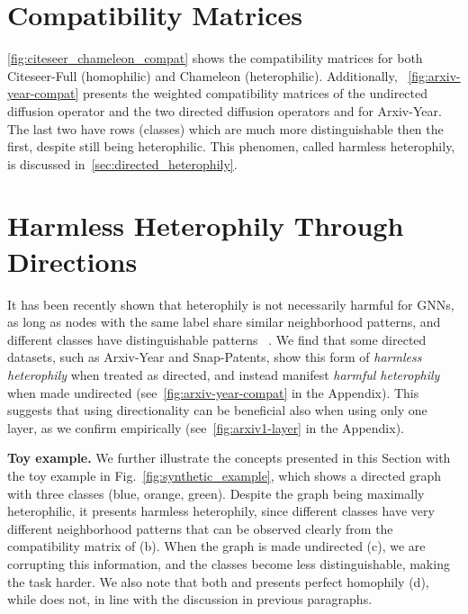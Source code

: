 \documentclass{article}
\theoremstyle{plain}
\theoremstyle{definition}
\theoremstyle{remark}
\begin{document}
\section{Compatibility Matrices}
\cref{fig:citeseer_chameleon_compat} shows the compatibility matrices for both Citeseer-Full (homophilic) and Chameleon (heterophilic). Additionally, ~\cref{fig:arxiv-year-compat} presents the weighted compatibility matrices of the undirected diffusion operator  and the two directed diffusion operators  and  for Arxiv-Year. The last two have rows (classes) which are much more distinguishable then the first, despite still being heterophilic. This phenomen, called harmless heterophily, is discussed in~\cref{sec:directed_heterophily}.

\section{Harmless Heterophily Through Directions}
It has been recently shown that heterophily is not necessarily harmful for GNNs, as long as nodes with the same label share similar neighborhood patterns, and different classes have distinguishable patterns~\cite{ma2022is, luan2023graph} . We find that some directed datasets, such as Arxiv-Year and Snap-Patents, show this form of \textit{harmless heterophily} when treated as directed, and instead manifest \textit{harmful heterophily} when made undirected (see~\cref{fig:arxiv-year-compat} in the Appendix). This suggests that using directionality can be beneficial also when using only one layer, as we confirm empirically (see~\cref{fig:arxiv1-layer} in the Appendix).

\textbf{Toy example.} We further illustrate the concepts presented in this Section with the toy example in Fig.~\ref{fig:synthetic_example}, which shows a directed graph with three classes (blue, orange, green). Despite the graph being maximally heterophilic, it presents harmless heterophily, since different classes have very different neighborhood patterns that can be observed clearly from the compatibility matrix of  (b). When the graph is made undirected (c), we are corrupting this information, and the classes become less distinguishable, making the task harder. We also note that both  and  presents perfect homophily (d), while  does not, in line with the discussion in previous paragraphs.
\end{document}
